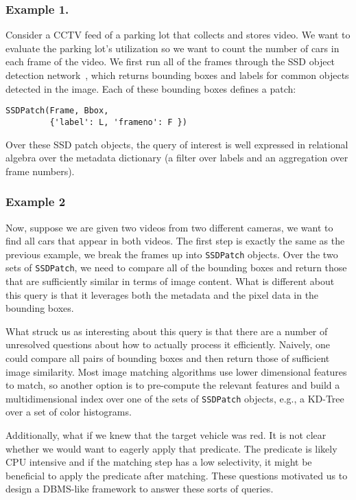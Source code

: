 \subsubsection{Example 1.}
Consider a CCTV feed of a parking lot that collects and stores video.
We want to evaluate the parking lot's utilization so we want to count the number of cars in each frame of the video.
We first run all of the frames through the SSD object detection network~\cite{liu2016ssd}, which returns bounding boxes and labels for common objects detected in the image.
Each of these bounding boxes defines a patch:
\begin{lstlisting}
SSDPatch(Frame, Bbox, 
         {'label': L, 'frameno': F })
\end{lstlisting}
Over these SSD patch objects, the query of interest is well expressed in relational algebra over the metadata dictionary (a filter over labels and an aggregation over frame numbers).

\subsubsection{Example 2}
Now, suppose we are given two videos from two different cameras, we want to find all cars that appear in both videos.
The first step is exactly the same as the previous example, we break the frames up into \texttt{SSDPatch} objects.
Over the two sets of \texttt{SSDPatch}, we need to compare all of the bounding boxes and return those that are sufficiently similar in terms of image content.
What is different about this query is that it leverages both the metadata and the pixel data in the bounding boxes.

What struck us as interesting about this query is that there are a number of unresolved questions about how to actually process it efficiently.
Naively, one could compare all pairs of bounding boxes and then return those of sufficient image similarity.
Most image matching algorithms use lower dimensional features to match, so another option is to pre-compute the relevant features and build a multidimensional index over one of the sets of \texttt{SSDPatch} objects, e.g., a KD-Tree over a set of color histograms.

Additionally, what if we knew that the target vehicle was red.
It is not clear whether we would want to eagerly apply that predicate. 
The predicate is likely CPU intensive and if the matching step has a low selectivity, it might be beneficial to apply the predicate after matching.
These questions motivated us to design a DBMS-like framework to answer these sorts of queries.

